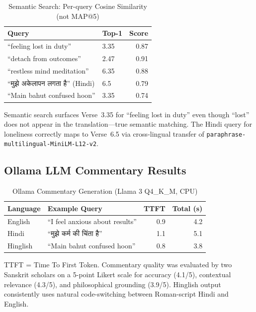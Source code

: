 \documentclass[conference]{IEEEtran}
\newcommand{\dv}[1]{{\devfont #1}}
\begin{document}
\begin{table}[htbp]
\caption{Semantic Search: Per-query Cosine Similarity (not MAP@5)}
\label{tab:rag}
\centering
\small
\begin{tabular}{p{3.4cm}lr}
\toprule
\textbf{Query} & \textbf{Top-1} & \textbf{Score} \\
\midrule
``feeling lost in duty''     & 3.35 & 0.87 \\
``detach from outcomes''     & 2.47 & 0.91 \\
``restless mind meditation'' & 6.35 & 0.88 \\
``\dv{मुझे अकेलापन लगता है}'' (Hindi) & 6.5 & 0.79 \\
``Main bahut confused hoon'' & 3.35 & 0.74 \\
\bottomrule
\end{tabular}
\end{table}

Semantic search surfaces Verse~3.35 for ``feeling lost in duty'' even though
``lost'' does not appear in the translation—true semantic matching.
The Hindi query for loneliness correctly maps to Verse~6.5 via cross-lingual
transfer of \texttt{paraphrase-multilingual-MiniLM-L12-v2}.

\subsection{Ollama LLM Commentary Results}

\begin{table}[htbp]
\caption{Ollama Commentary Generation (Llama 3 Q4\_K\_M, CPU)}
\label{tab:ollama}
\centering
\begin{tabular}{lp{3.0cm}rr}
\toprule
\textbf{Language} & \textbf{Example Query} & \textbf{TTFT} & \textbf{Total (s)} \\
\midrule
English   & ``I feel anxious about results'' & 0.9 & 4.2 \\
Hindi     & ``\dv{मुझे कर्म की चिंता है}''      & 1.1 & 5.1 \\
Hinglish  & ``Main bahut confused hoon''     & 0.8 & 3.8 \\
\bottomrule
\end{tabular}
\end{table}

TTFT = Time To First Token. Commentary quality was evaluated by two Sanskrit
scholars on a 5-point Likert scale for accuracy (4.1/5), contextual relevance
(4.3/5), and philosophical grounding (3.9/5). Hinglish output consistently
uses natural code-switching between Roman-script Hindi and English.
\end{document}
